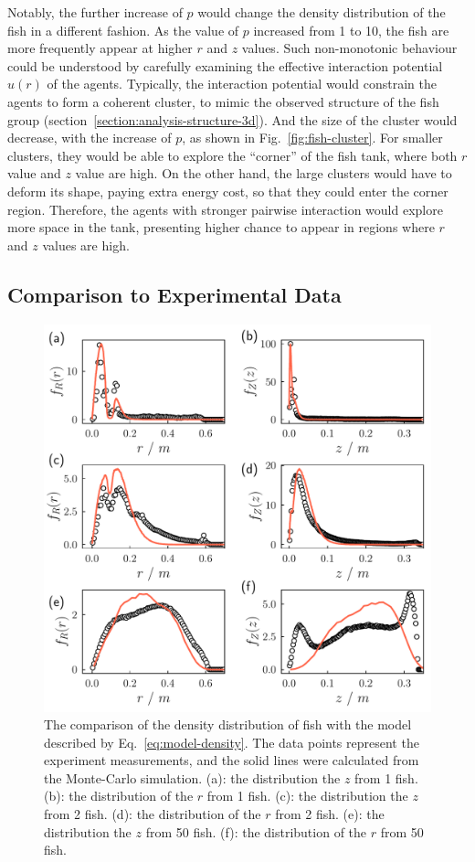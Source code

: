 \documentclass[11pt,twoside]{report}
\begin{document}
Notably, the further increase of $p$ would change the density distribution of the fish in a different fashion. As the value of $p$ increased from 1 to 10, the fish are more frequently appear at higher $r$ and $z$ values. Such non-monotonic behaviour could be understood by carefully examining the effective interaction potential $u(r)$ of the agents.
Typically, the interaction potential would constrain the agents to form a coherent cluster, to mimic the observed structure of the fish group (section~\ref{section:analysis-structure-3d}). And the size of the cluster would decrease, with the increase of $p$, as shown in Fig.~\ref{fig:fish-cluster}.
For smaller clusters, they would be able to explore the ``corner'' of the fish tank, where both $r$ value and $z$ value are high.
On the other hand, the large clusters would have to deform its shape, paying extra energy cost, so that they could enter the corner region.
Therefore, the agents with stronger pairwise interaction would explore more space in the tank, presenting higher chance to appear in regions where $r$ and $z$ values are high.





\subsection{Comparison to Experimental Data}

\begin{figure}
  \includegraphics[width=0.9\linewidth]{model-density}
  \caption[Comparing the density distribution of the fish and the model]{
  The comparison of the density distribution of fish with the model described by Eq.~\ref{eq:model-density}. The data points represent the experiment measurements, and the solid lines were calculated from the Monte-Carlo simulation.
  (a): the distribution the $z$ from 1 fish.
  (b): the distribution of the $r$ from 1 fish.
  (c): the distribution the $z$ from 2 fish.
  (d): the distribution of the $r$ from 2 fish.
  (e): the distribution the $z$ from 50 fish.
  (f): the distribution of the $r$ from 50 fish.
  }
  \label{fig:model-density}
\end{figure}
\end{document}
